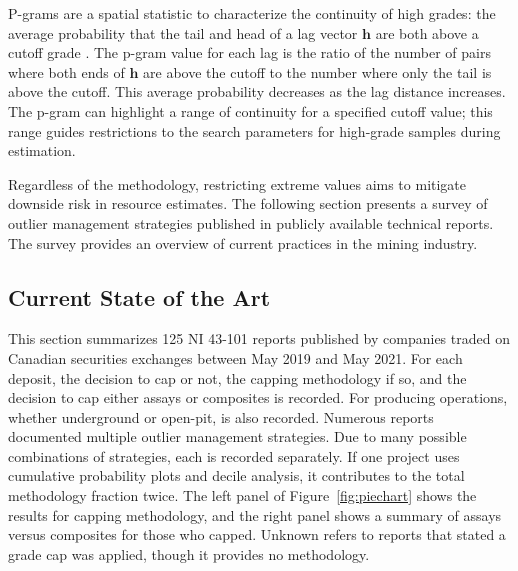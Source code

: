 P-grams are a spatial statistic to characterize the continuity of high grades: the average probability that the tail and head of a lag vector $\mathbf{h}$ are both above a cutoff grade \citep{leuangthong2015dealing, nowak2019optimal}. The p-gram value for each lag is the ratio of the number of pairs where both ends of $\mathbf{h}$ are above the cutoff to the number where only the tail is above the cutoff. This average probability decreases as the lag distance increases. The p-gram can highlight a range of continuity for a specified cutoff value; this range guides restrictions to the search parameters for high-grade samples during estimation.


Regardless of the methodology, restricting extreme values aims to mitigate downside risk in resource estimates. The following section presents a survey of outlier management strategies published in publicly available technical reports. The survey provides an overview of current practices in the mining industry.

\FloatBarrier
\subsection{Current State of the Art}
\label{subsec:02state}

This section summarizes 125 \gls{NI} 43-101 reports published by companies traded on Canadian securities exchanges between May 2019 and May 2021. For each deposit, the decision to cap or not, the capping methodology if so, and the decision to cap either assays or composites is recorded. For producing operations, whether underground or open-pit, is also recorded. Numerous reports documented multiple outlier management strategies. Due to many possible combinations of strategies, each is recorded separately. If one project uses cumulative probability plots and decile analysis, it contributes to the total methodology fraction twice. The left panel of Figure~\ref{fig:piechart} shows the results for capping methodology, and the right panel shows a summary of assays versus composites for those who capped. Unknown refers to reports that stated a grade cap was applied, though it provides no methodology.

